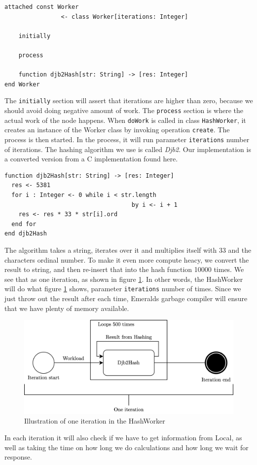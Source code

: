 \begin{minipage}{\linewidth}
\begin{lstlisting}[language=emerald]
attached const Worker 
                <- class Worker[iterations: Integer]
                
    initially
    
    process
    
    function djb2Hash[str: String] -> [res: Integer]
end Worker
\end{lstlisting}
\end{minipage}
The \verb|initially| section will assert that iterations are higher than zero, because we should avoid doing negative amount of work. The \verb|process| section is where the actual work of the node happens. When \verb|doWork| is called in class \verb|HashWorker|, it creates an instance of the Worker class by invoking operation \verb|create|. The process is then started. In the process, it will run parameter \verb|iterations| number of iterations. The hashing algorithm we use is called \textit{Djb2}. Our implementation is a converted version from a C implementation found here\cite{noauthor_hash_nodate}. 
\begin{lstlisting}[language=emerald]
function djb2Hash[str: String] -> [res: Integer]
  res <- 5381
  for i : Integer <- 0 while i < str.length 
                                    by i <- i + 1
    res <- res * 33 * str[i].ord
  end for
end djb2Hash
\end{lstlisting}
The algorithm takes a string, iterates over it and multiplies itself with 33 and the characters ordinal number. To make it even more compute heacy, we convert the result to string, and then re-insert that into the hash function 10000 times. We see that as one iteration, as shown in figure \ref{fig:Hashing_algorithm_iteration}. In other words, the HashWorker will do what figure \ref{fig:Hashing_algorithm_iteration} shows, parameter \verb|iterations| number of times. Since we just throw out the result after each time, Emeralds garbage compiler will ensure that we have plenty of memory available. 
\begin{figure}[t]
    \centering
    \includegraphics[scale=0.9]{chapters/5_implementation/figures/Iteration.png}
    \caption{Illustration of one iteration in the HashWorker}
    \label{fig:Hashing_algorithm_iteration}
\end{figure}
In each iteration it will also check if we have to get information from Local, as well as taking the time on how long we do calculations and how long we wait for response.



